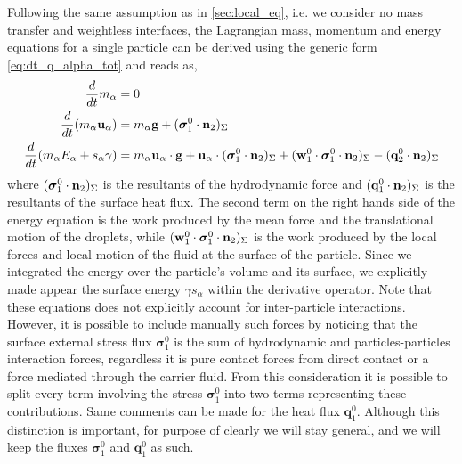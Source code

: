 Following the same assumption as in \ref{sec:local_eq}, i.e. we consider no mass transfer and weightless interfaces, the Lagrangian  mass, momentum and energy equations for a single particle can be derived using the generic form \ref{eq:dt_q_alpha_tot} and reads as, 
\begin{align}
    \label{eq:dt_m_alpha}
    \frac{d}{d t} m_\alpha
    &= 
    0\\
    \label{eq:dt_p_alpha}
    \frac{d}{d t} (m_\alpha \textbf{u}_\alpha)
    &= 
    m_\alpha\textbf{g}
    +  ( \bm{\sigma}_1^0 \cdot \textbf{n}_2 )_{\Sigma}\\
    \label{eq:dt_E_alpha}
    \frac{d}{d t} (m_\alpha E_\alpha + s_\alpha \gamma)
    &= 
    m_\alpha \textbf{u}_\alpha \cdot \textbf{g}
    +\textbf{u}_\alpha \cdot ( \bm{\sigma}_1^0 \cdot \textbf{n}_2 )_{\Sigma}   
    +( \textbf{w}_1^0 \cdot \bm{\sigma}_1^0 \cdot  \textbf{n}_2 )_{\Sigma} 
    - ( \textbf{q}_2^0 \cdot \textbf{n}_2 )_{\Sigma}
\end{align}
where  $(   \bm{\sigma}_1^0 \cdot \textbf{n}_2  )_{\Sigma}$ is the resultants of the hydrodynamic force and $(  \textbf{q}_1^0 \cdot \textbf{n}_2  )_{\Sigma}$ is the resultants of the surface heat flux. 
The second term on the right hands side of the energy equation is the work produced by the mean force and the translational motion of the droplets, while $( \textbf{w}_1^0 \cdot \bm{\sigma}_1^0 \cdot  \textbf{n}_2 )_{\Sigma}$ is the work produced by the local forces and local motion of the fluid at the surface of the particle.
Since we integrated the energy over the particle's volume and its surface, we explicitly made appear the surface energy $\gamma s_\alpha$ within the derivative operator. 
Note that these equations does not explicitly account for inter-particle interactions. 
However, it is possible to include manually such forces by noticing that the surface external stress flux $\bm{\sigma}_1^0$ is the sum of hydrodynamic and particles-particles interaction forces, regardless it is pure contact forces from direct contact or a force mediated through the carrier fluid.
From this consideration it is possible to split every term involving the stress $\bm{\sigma}_1^0$ into two terms representing these contributions. 
Same comments can be made for the heat flux $\textbf{q}_1^0$. 
Although this distinction is important, for purpose of clearly we will stay general, and we will keep the fluxes $\bm{\sigma}_1^0$ and $\textbf{q}_1^0$ as such. 

